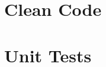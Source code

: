 \documentclass[aspectratio=1610, 9pt]{beamer}
\begin{document}
\section{Clean Code}
\begin{frame}
    
\end{frame}

\section{Unit Tests}
\end{document}
